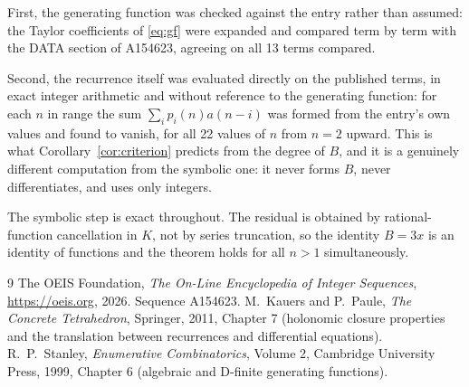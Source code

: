 \documentclass[11pt,a4paper]{article}
\theoremstyle{plain}
\theoremstyle{definition}
\begin{document}
First, the generating function was checked against the entry rather than assumed: the
Taylor coefficients of \eqref{eq:gf} were expanded and compared term by term with the DATA
section of A154623, agreeing on all 13 terms compared.

Second, the recurrence itself was evaluated directly on the published terms, in exact
integer arithmetic and without reference to the generating function: for each $n$ in range
the sum $\sum_{i}p_{i}(n)a(n-i)$ was formed from the entry's own values and found to
vanish, for all 22 values of $n$ from $n=2$ upward. This is what
Corollary~\ref{cor:criterion} predicts from the degree of $B$, and it is a genuinely
different computation from the symbolic one: it never forms $B$, never differentiates, and
uses only integers.

The symbolic step is exact throughout. The residual is obtained by rational-function
cancellation in $K$, not by series truncation, so the identity $B=3 x$ is an
identity of functions and the theorem holds for all $n>1$ simultaneously.

\begin{thebibliography}{9}
 The OEIS Foundation, \emph{The On-Line Encyclopedia of Integer Sequences},
\url{https://oeis.org}, 2026. Sequence A154623.
 M.~Kauers and P.~Paule, \emph{The Concrete Tetrahedron}, Springer, 2011,
Chapter 7 (holonomic closure properties and the translation between recurrences and
differential equations).
 R.~P.~Stanley, \emph{Enumerative Combinatorics}, Volume 2, Cambridge
University Press, 1999, Chapter 6 (algebraic and D-finite generating functions).
\end{thebibliography}
\end{document}
